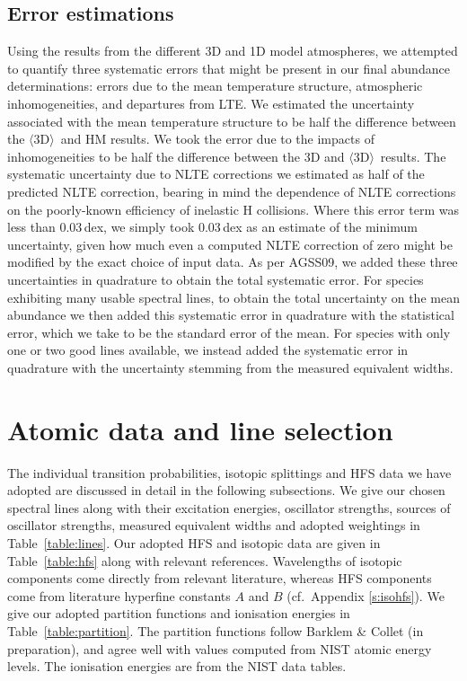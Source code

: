 \documentclass[traditabstract]{aa}
\newcommand{\oneDAV}{$\langle\mathrm{3D}\rangle$}
\begin{document}
\subsection{Error estimations}
\label{s:errors}
Using the results from the different 3D and 1D model atmospheres, we attempted to quantify three systematic errors that might be present in our final abundance determinations: errors due to the mean temperature structure, atmospheric inhomogeneities, and departures from LTE.  We estimated the uncertainty associated with the mean temperature structure to be half the difference between the \oneDAV\ and HM results.  We took the error due to the impacts of inhomogeneities to be half the difference between the 3D and \oneDAV\ results.  The systematic uncertainty due to NLTE corrections we estimated as half of the predicted NLTE correction, bearing in mind the dependence of NLTE corrections on the poorly-known efficiency of inelastic H collisions.  Where this error term was less than 0.03\,dex, we simply took 0.03\,dex as an estimate of the minimum uncertainty, given how much even a computed NLTE correction of zero might be modified by the exact choice of input data.  As per AGSS09, we added these three uncertainties in quadrature to obtain the total systematic error.  For species exhibiting many usable spectral lines, to obtain the total uncertainty on the mean abundance we then added this systematic error in quadrature with the statistical error, which we take to be the standard error of the mean.  For species with only one or two good lines available, we instead added the systematic error in quadrature with the uncertainty stemming from the measured equivalent widths.


\section{Atomic data and line selection}
\label{s:atomicdata}

The individual transition probabilities, isotopic splittings and HFS data we have adopted are discussed in detail in the following subsections.  We give our chosen spectral lines along with their excitation energies, oscillator strengths, sources of oscillator strengths, measured equivalent widths and adopted weightings in Table~\ref{table:lines}.  Our adopted HFS and isotopic data are given in Table~\ref{table:hfs} along with relevant references.  Wavelengths of isotopic components come directly from relevant literature, whereas HFS components come from literature hyperfine constants $A$ and $B$ (cf.\ Appendix \ref{s:isohfs}).  We give our adopted partition functions and ionisation energies in Table~\ref{table:partition}.  The partition functions follow Barklem \& Collet (in preparation), and agree well with values computed from NIST atomic energy levels. The ionisation energies are from the NIST data tables.
\end{document}
